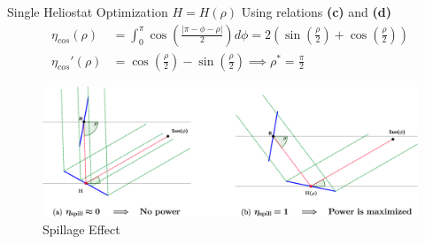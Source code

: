 \documentclass[10pt, xcolor={dvipsnames}]{beamer}
\begin{document}
\begin{frame}{Single Heliostat Optimization $H = H(\rho)$}
Using relations {\bf(c)} and {\bf(d)}
\begin{align*} %
\eta_{cos}(\rho) &= \int_{0}^{\pi} \cos \left( \frac{|\pi - \phi - \rho |}{2} \right) d\phi 
= 2 \left( \sin \left( \frac{\rho}{2} \right) 
+ \cos \left(\frac{\rho}{2}\right)  \right) \\[.5em]
\eta_{cos}'(\rho) &= \cos \left(\frac{\rho}{2}\right) - \sin \left( \frac{\rho}{2} \right) 
\implies \rho^{*} = \frac{\pi}{2}
\end{align*}

\begin{center}
\begin{figure}
\includegraphics[width=.95\textwidth]{../figures/spillage-problem-crop.pdf}
\caption{Spillage Effect}
\end{figure}
\end{center}
\end{frame}
\end{document}

